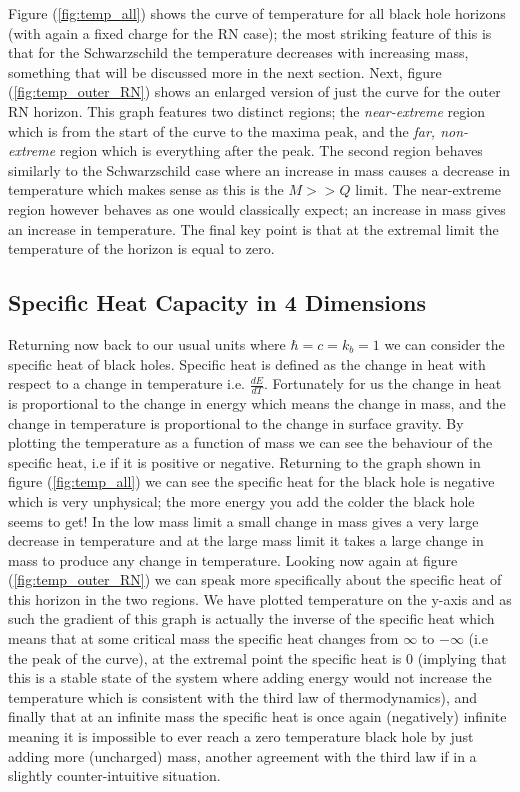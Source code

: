\documentclass[12pt]{article}
\numberwithin{equation}{section}
\numberwithin{figure}{section}
\begin{document}
Figure (\ref{fig:temp_all}) shows the curve of temperature for all black hole horizons (with again a fixed charge for the RN case); the most striking feature of this is that for the Schwarzschild the temperature decreases with increasing mass, something that will be discussed more in the next section. Next, figure (\ref{fig:temp_outer_RN}) shows an enlarged version of just the curve for the outer RN horizon. This graph features two distinct regions; the \emph{near-extreme} region which is from the start of the curve to the maxima peak, and the \emph{far, non-extreme} region which is everything after the peak. The second region behaves similarly to the Schwarzschild case where an increase in mass causes a decrease in temperature which makes sense as this is the $M>>Q$ limit. The near-extreme region however behaves as one would classically expect; an increase in mass gives an increase in temperature. The final key point is that at the extremal limit the temperature of the horizon is equal to zero. 
\subsection{Specific Heat Capacity in 4 Dimensions} %
\label{sub:specific_heat_capacity_in_4_dimensions}
Returning now back to our usual units where $\hbar = c = k_b = 1$ we can consider the specific heat of black holes. Specific heat is defined as the change in heat with respect to a change in temperature i.e. $\frac{dE}{dT}$. Fortunately for us the change in heat is proportional to the change in energy which means the change in mass, and the change in temperature is proportional to the change in surface gravity. By plotting the temperature as a function of mass we can see the behaviour of the specific heat, i.e if it is positive or negative. Returning to the graph shown in figure (\ref{fig:temp_all}) we can see the specific heat for the black hole is negative which is very unphysical; the more energy you add the colder the black hole seems to get! In the low mass limit a small change in mass gives a very large decrease in temperature and at the large mass limit it takes a large change in mass to produce any change in temperature. Looking now again at figure (\ref{fig:temp_outer_RN}) we can speak more specifically about the specific heat of this horizon in the two regions. We have plotted temperature on the y-axis and as such the gradient of this graph is actually the inverse of the specific heat which means that at some critical mass the specific heat changes from $\infty$ to $-\infty$ (i.e the peak of the curve), at the extremal point the specific heat is 0 (implying that this is a stable state of the system where adding energy would not increase the temperature which is consistent with the third law of thermodynamics), and finally that at an infinite mass the specific heat is once again (negatively) infinite meaning it is impossible to ever reach a zero temperature black hole by just adding more (uncharged) mass, another agreement with the third law if in a slightly counter-intuitive situation. 
\end{document}
